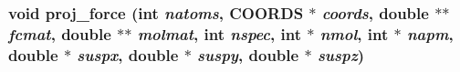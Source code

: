 \subsubsection{\setlength{\rightskip}{0pt plus 5cm}void proj\_\-force (int {\em natoms}, {\bf COORDS} $\ast$ {\em coords}, double $\ast$$\ast$ {\em fcmat}, double $\ast$$\ast$ {\em molmat}, int {\em nspec}, int $\ast$ {\em nmol}, int $\ast$ {\em napm}, double $\ast$ {\em suspx}, double $\ast$ {\em suspy}, double $\ast$ {\em suspz})}\label{nma_2md__projforce_8c_e284b4aa67e8e9b33d1bbf5ed4d8765a}


